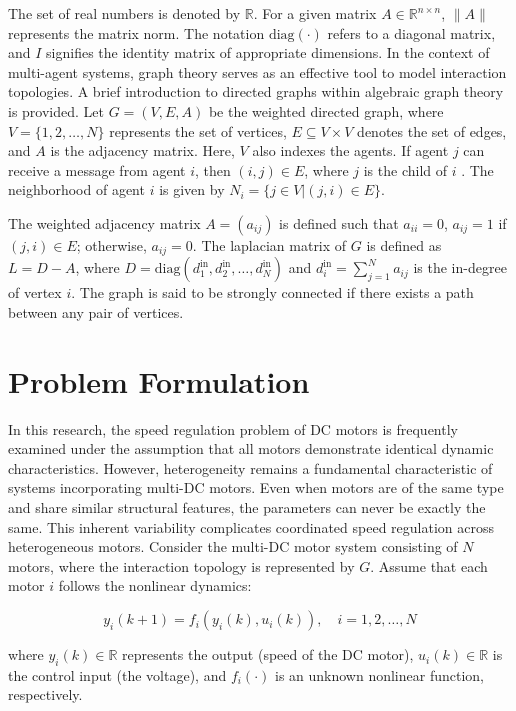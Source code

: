 \documentclass[journal,onecolumn]{IEEEtran}
\begin{document}
The set of real numbers is denoted by $\mathbb{R}$. For a given matrix $A \in \mathbb{R}^{n \times n}$, $\|A\|$ represents the matrix norm. The notation $\text{diag}(\cdot)$ refers to a diagonal matrix, and $I$ signifies the identity matrix of appropriate dimensions. In the context of multi-agent systems, graph theory serves as an effective tool to model interaction topologies. A brief introduction to directed graphs within algebraic graph theory is provided. Let $G = (V, E, A)$ be the weighted directed graph, where $V = \{1, 2, \dots, N\}$ represents the set of vertices, $E \subseteq V \times V$ denotes the set of edges, and $A$ is the adjacency matrix. Here, $V$ also indexes the agents. If agent $j$ can receive a message from agent $i$, then $(i,j) \in E$, where $j$ is the child of $i$ . The neighborhood of agent $i$ is given by $N_i = \{j \in V | (j,i) \in E \}$.

The weighted adjacency matrix $A = (a_{ij})$ is defined such that $a_{ii} = 0$, $a_{ij} = 1$ if $(j,i) \in E$; otherwise, $a_{ij} = 0$. The laplacian matrix of $G$ is defined as $L = D - A$, where $D = \text{diag}(d_1^{\text{in}}, d_2^{\text{in}}, \dots, d_N^{\text{in}})$ and $d_i^{\text{in}} = \sum_{j=1}^{N} a_{i j}$ is the in-degree of vertex $i$. The graph is said to be strongly connected if there exists a path between any pair of vertices.

\section{Problem Formulation}

In this research, the speed regulation problem of DC motors is frequently examined under the assumption that all motors demonstrate identical dynamic characteristics. However, heterogeneity remains a fundamental characteristic of systems incorporating multi-DC motors. Even when motors are of the same type and share similar structural features, the parameters can never be exactly the same. This inherent variability complicates coordinated speed regulation across heterogeneous motors. Consider the multi-DC motor system consisting of $N$ motors, where the interaction topology is represented by $G$. Assume that each motor $i$ follows the nonlinear dynamics:

\begin{equation}
    y_i(k+1) = f_i(y_i(k), u_i(k)), \quad i = 1, 2, \dots, N
\end{equation}

where $y_i(k) \in \mathbb{R}$ represents the output (speed of the DC motor), $u_i(k) \in \mathbb{R}$ is the control input (the voltage), and $f_i(\cdot)$ is an unknown nonlinear function, respectively.
\end{document}
